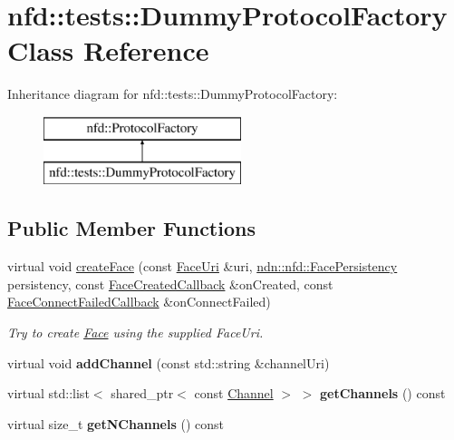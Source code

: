 \hypertarget{classnfd_1_1tests_1_1DummyProtocolFactory}{}\section{nfd\+:\+:tests\+:\+:Dummy\+Protocol\+Factory Class Reference}
\label{classnfd_1_1tests_1_1DummyProtocolFactory}
Inheritance diagram for nfd\+:\+:tests\+:\+:Dummy\+Protocol\+Factory\+:\begin{figure}[H]
\begin{center}
\leavevmode
\includegraphics[height=2.000000cm]{classnfd_1_1tests_1_1DummyProtocolFactory}
\end{center}
\end{figure}
\subsection*{Public Member Functions}
\begin{DoxyCompactItemize}
\item 
virtual void \hyperlink{classnfd_1_1tests_1_1DummyProtocolFactory_af5e5941643b9910c8e07f14112367dc2}{create\+Face} (const \hyperlink{classndn_1_1util_1_1FaceUri}{Face\+Uri} \&uri, \hyperlink{group__management_ga05df4b7c484a0fae25d3e65962511bac}{ndn\+::nfd\+::\+Face\+Persistency} persistency, const \hyperlink{namespacenfd_a6d4b91580c829552a452c53458381b0f}{Face\+Created\+Callback} \&on\+Created, const \hyperlink{namespacenfd_ae87d4f07de26f4939691439b51f2dd83}{Face\+Connect\+Failed\+Callback} \&on\+Connect\+Failed)
\begin{DoxyCompactList}\small\item\em Try to create \hyperlink{classnfd_1_1Face}{Face} using the supplied Face\+Uri. \end{DoxyCompactList}\item 
virtual void {\bfseries add\+Channel} (const std\+::string \&channel\+Uri)\hypertarget{classnfd_1_1tests_1_1DummyProtocolFactory_a399a9117fa81e5daeadf207c8883d06c}{}\label{classnfd_1_1tests_1_1DummyProtocolFactory_a399a9117fa81e5daeadf207c8883d06c}

\item 
virtual std\+::list$<$ shared\+\_\+ptr$<$ const \hyperlink{classnfd_1_1Channel}{Channel} $>$ $>$ {\bfseries get\+Channels} () const\hypertarget{classnfd_1_1tests_1_1DummyProtocolFactory_afb03d03261a1e054e7a977c644a3b951}{}\label{classnfd_1_1tests_1_1DummyProtocolFactory_afb03d03261a1e054e7a977c644a3b951}

\item 
virtual size\+\_\+t {\bfseries get\+N\+Channels} () const\hypertarget{classnfd_1_1tests_1_1DummyProtocolFactory_a8ef57176b2546247e2b36e2a0c2ddd08}{}\label{classnfd_1_1tests_1_1DummyProtocolFactory_a8ef57176b2546247e2b36e2a0c2ddd08}

\end{DoxyCompactItemize}


